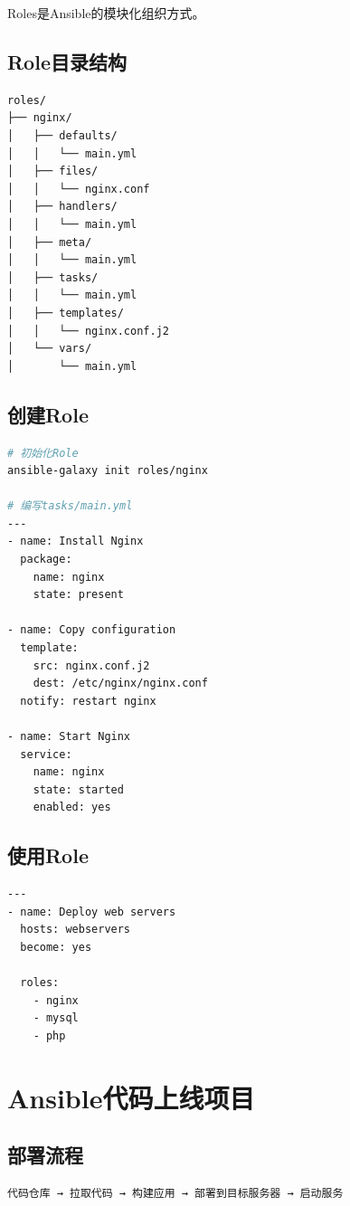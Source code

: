 \documentclass[12pt,UTF8]{ctexbook}
\begin{document}
Roles是Ansible的模块化组织方式。

\subsection*{Role目录结构}
\begin{lstlisting}
roles/
├── nginx/
│   ├── defaults/
│   │   └── main.yml
│   ├── files/
│   │   └── nginx.conf
│   ├── handlers/
│   │   └── main.yml
│   ├── meta/
│   │   └── main.yml
│   ├── tasks/
│   │   └── main.yml
│   ├── templates/
│   │   └── nginx.conf.j2
│   └── vars/
│       └── main.yml
\end{lstlisting}

\subsection*{创建Role}
\begin{lstlisting}[language=bash]
# 初始化Role
ansible-galaxy init roles/nginx

# 编写tasks/main.yml
---
- name: Install Nginx
  package:
    name: nginx
    state: present

- name: Copy configuration
  template:
    src: nginx.conf.j2
    dest: /etc/nginx/nginx.conf
  notify: restart nginx

- name: Start Nginx
  service:
    name: nginx
    state: started
    enabled: yes
\end{lstlisting}

\subsection*{使用Role}
\begin{lstlisting}
---
- name: Deploy web servers
  hosts: webservers
  become: yes
  
  roles:
    - nginx
    - mysql
    - php
\end{lstlisting}

\section{Ansible代码上线项目}
\label{sec:ansible-deployment}

\subsection*{部署流程}
\begin{lstlisting}
代码仓库 → 拉取代码 → 构建应用 → 部署到目标服务器 → 启动服务
\end{lstlisting}
\end{document}
